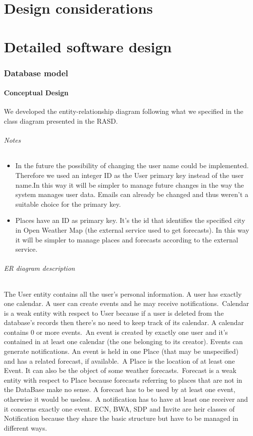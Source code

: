 \documentclass[10pt,a4paper,titlepage]{article}
\begin{document}
\clearpage
\part{Design considerations}

\clearpage
\part{Detailed software design}
\section{Database model}
\subsection{Conceptual Design}
We developed the entity-relationship diagram following what we specified in the class diagram presented in the RASD. 
\paragraph{Notes}
\begin{itemize}
\item In the future the possibility of changing the user name could be implemented. Therefore we used an integer ID as the User primary key instead of the user name.In this way it will be simpler to manage future changes in the way the system manages user data. 
Emails can already be changed and thus weren't a suitable choice for the primary key.
\item Places have an ID as primary key. It's the id that identifies the specified city in Open Weather Map (the external service used to get forecasts). In this way it will be simpler to manage places and forecasts according to the external service.   
\end{itemize}
\paragraph{ER diagram description}
The User entity contains all the  user's personal information. A user has exactly one calendar. A user can create events and he may receive notifications.\
Calendar is a weak entity with respect to User because if a user is deleted from the database's records then there's no need  to keep track of its calendar. A calendar contains 0 or more events.\
An event is created by exactly one user and it's contained in at least one calendar (the one belonging to its creator). Events can generate notifications. An event is held in one Place (that may be unspecified) and has a related forecast, if available.\
A Place is the location of at least one Event. It can also be the object of some weather forecasts.\
Forecast is a weak entity with respect to Place because forecasts referring to places that are not in the DataBase make no sense. A forecast has to be used by at least one event, otherwise it would be useless.\
A notification has to have at least one receiver and it concerns exactly one event. ECN, BWA, SDP and Invite are heir classes of Notification because they share the basic structure but have to be managed in different ways.



\clearpage
\tableofcontents
\end{document}
